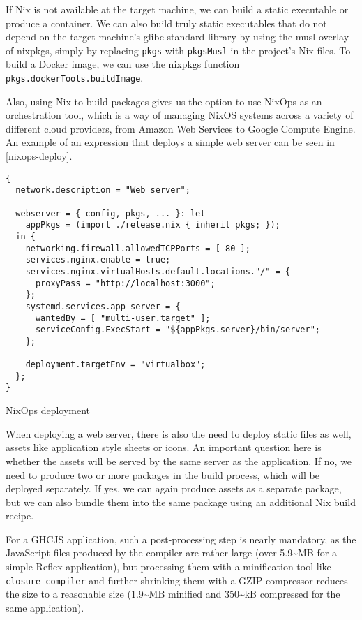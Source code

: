 \documentclass[english,odsaz]{fitthesis}
\begin{document}
If Nix is not available at the target machine, we can build a static executable
or produce a container. We can also build truly static executables that do not
depend on the target machine's glibc standard library by using the musl overlay
of nixpkgs, simply by replacing \texttt{pkgs} with \texttt{pkgsMusl} in the project's Nix files.
To build a Docker image, we can use the nixpkgs function
\texttt{pkgs.dockerTools.buildImage}.

Also, using Nix to build packages gives us the option to use NixOps as an
orchestration tool, which is a way of managing NixOS systems across a variety of
different cloud providers, from Amazon Web Services to Google Compute Engine. An
example of an expression that deploys a simple web server can be seen in
\ref{nixops-deploy}.

\begin{listing}[htbp]
\begin{verbatim}
{
  network.description = "Web server";

  webserver = { config, pkgs, ... }: let
    appPkgs = (import ./release.nix { inherit pkgs; });
  in {
    networking.firewall.allowedTCPPorts = [ 80 ];
    services.nginx.enable = true;
    services.nginx.virtualHosts.default.locations."/" = {
      proxyPass = "http://localhost:3000";
    };
    systemd.services.app-server = {
      wantedBy = [ "multi-user.target" ];
      serviceConfig.ExecStart = "${appPkgs.server}/bin/server";
    };

    deployment.targetEnv = "virtualbox";
  };
}
\end{verbatim}
\caption{NixOps deployment \label{nixops-deploy}}
\end{listing}

When deploying a web server, there is also the need to deploy static files as
well, assets like application style sheets or icons. An important question here
is whether the assets will be served by the same server as the application. If
no, we need to produce two or more packages in the build process, which will be
deployed separately. If yes, we can again produce assets as a separate package,
but we can also bundle them into the same package using an additional Nix build
recipe.

For a GHCJS application, such a post-processing step is nearly mandatory, as the
JavaScript files produced by the compiler are rather large (over 5.9\textasciitilde{}MB for a
simple Reflex application), but processing them with a minification tool like
\texttt{closure-compiler} and further shrinking them with a GZIP compressor reduces the
size to a reasonable size (1.9\textasciitilde{}MB minified and 350\textasciitilde{}kB compressed for the same
application).
\end{document}
